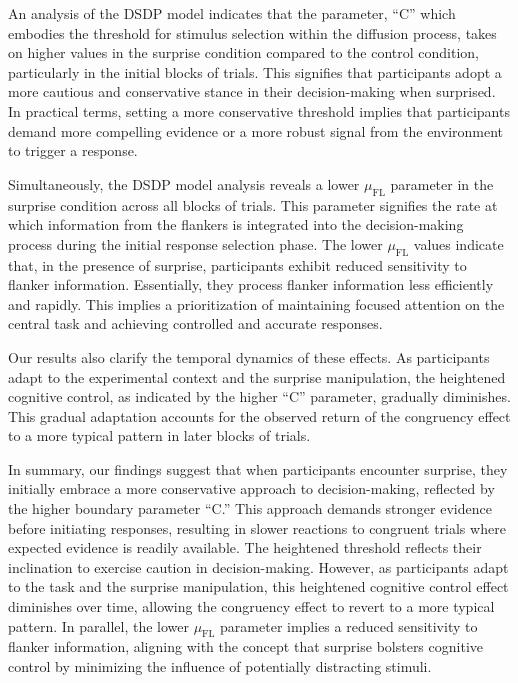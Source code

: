 \documentclass[
  man]{apa7}
\begin{document}
An analysis of the DSDP model indicates that the parameter, ``C'' which embodies the threshold for stimulus selection within the diffusion process, takes on higher values in the surprise condition compared to the control condition, particularly in the initial blocks of trials. This signifies that participants adopt a more cautious and conservative stance in their decision-making when surprised. In practical terms, setting a more conservative threshold implies that participants demand more compelling evidence or a more robust signal from the environment to trigger a response.

Simultaneously, the DSDP model analysis reveals a lower \(\mu_{\text{FL}}\) parameter in the surprise condition across all blocks of trials. This parameter signifies the rate at which information from the flankers is integrated into the decision-making process during the initial response selection phase. The lower \(\mu_{\text{FL}}\) values indicate that, in the presence of surprise, participants exhibit reduced sensitivity to flanker information. Essentially, they process flanker information less efficiently and rapidly. This implies a prioritization of maintaining focused attention on the central task and achieving controlled and accurate responses.

Our results also clarify the temporal dynamics of these effects. As participants adapt to the experimental context and the surprise manipulation, the heightened cognitive control, as indicated by the higher ``C'' parameter, gradually diminishes. This gradual adaptation accounts for the observed return of the congruency effect to a more typical pattern in later blocks of trials.

In summary, our findings suggest that when participants encounter surprise, they initially embrace a more conservative approach to decision-making, reflected by the higher boundary parameter ``C.'' This approach demands stronger evidence before initiating responses, resulting in slower reactions to congruent trials where expected evidence is readily available. The heightened threshold reflects their inclination to exercise caution in decision-making. However, as participants adapt to the task and the surprise manipulation, this heightened cognitive control effect diminishes over time, allowing the congruency effect to revert to a more typical pattern. In parallel, the lower \(\mu_{\text{FL}}\) parameter implies a reduced sensitivity to flanker information, aligning with the concept that surprise bolsters cognitive control by minimizing the influence of potentially distracting stimuli.
\end{document}
